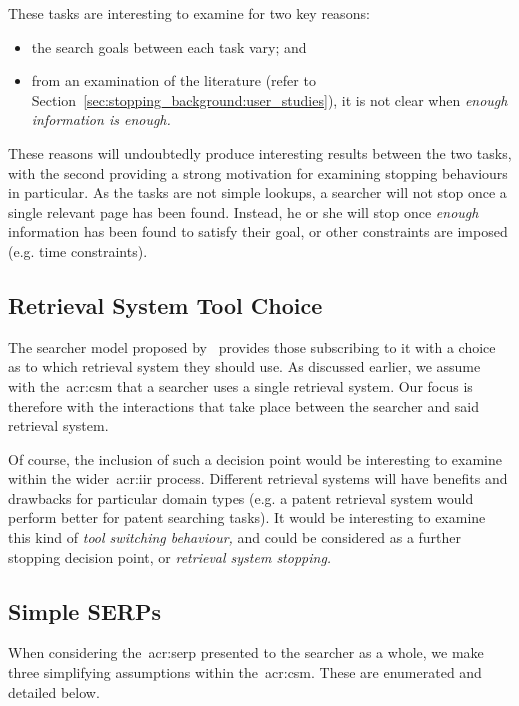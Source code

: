 These tasks are interesting to examine for two key reasons:

\begin{itemize}
    \item{the search goals between each task vary; and}
    \item{from an examination of the literature (refer to Section~\ref{sec:stopping_background:user_studies}), it is not clear when \emph{enough information is enough.}}
\end{itemize}

These reasons will undoubtedly produce interesting results between the two tasks, with the second providing a strong motivation for examining stopping behaviours in particular. As the tasks are not simple lookups, a searcher will not stop once a single relevant page has been found. Instead, he or she will stop once \emph{enough}~\citep{zach2005enough_is_enough} information has been found to satisfy their goal, or other constraints are imposed (e.g. time constraints).

\subsection{Retrieval System Tool Choice}\label{sec:csm:assumptions:tool}
The searcher model proposed by~\cite{thomas2014modelling_behaviour} provides those subscribing to it with a choice as to which retrieval system they should use. As discussed earlier, we assume with the~\gls{acr:csm} that a searcher uses a single retrieval system. Our focus is therefore with the interactions that take place between the searcher and said retrieval system.

Of course, the inclusion of such a decision point would be interesting to examine within the wider~\gls{acr:iir} process. Different retrieval systems will have benefits and drawbacks for particular domain types (e.g. a patent retrieval system would perform better for patent searching tasks). It would be interesting to examine this kind of \emph{tool switching behaviour,} and could be considered as a further stopping decision point, or \emph{retrieval system stopping.}

\subsection{Simple SERPs}
When considering the~\gls{acr:serp} presented to the searcher as a whole, we make three simplifying assumptions within the~\gls{acr:csm}. These are enumerated and detailed below.


